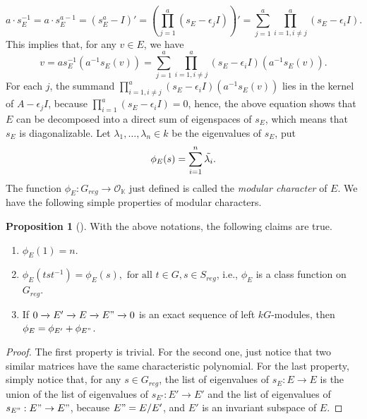\documentclass[12pt,a4paper]{report}
\theoremstyle{definition}
\newtheorem{proposition}[theorem]{Proposition}
\theoremstyle{remark}
\theoremstyle{definition}
\begin{document}
\begin{equation*}
    a\cdot s_E^{-1} = a\cdot s_E^{a-1} = (s_E^a - I)' = \left(\prod\limits_{j = 1}^{a}(s_E - \epsilon_j I) \right)' = \sum\limits_{j=1}^{a}\prod\limits_{i = 1, i\neq j}^{a}(s_E - \epsilon_i I).
\end{equation*}
This implies that, for any $v\in E$, we have
\begin{equation*}
    v = a s_E^{-1} (a^{-1} s_E(v)) = \sum\limits_{j=1}^{a}\prod\limits_{i = 1, i\neq j}^{a}(s_E - \epsilon_i I)(a^{-1}s_E(v)).
\end{equation*}
For each $j$, the summand $\prod\limits_{i = 1, i\neq j}^{a}(s_E - \epsilon_i I)(a^{-1}s_E(v))$ lies in the kernel of $A-\epsilon_j I$, because $\prod\limits_{i = 1}^{a}(s_E - \epsilon_i I) = 0$, hence, the above equation shows that $E$ can be decomposed into a direct sum of eigenspaces of $s_E$, which means that $s_E$ is diagonalizable.\smallbreak
Let $\lambda_1, \ldots, \lambda_n \in k$ be the eigenvalues of $s_E$, put
\begin{equation*}
    \phi_E(s) = \sum\limits_{i=1}^{n}\Tilde{\lambda_i}.
\end{equation*}
The function $\phi_E: G_{reg}\to \mathcal{O}_{\mathbb{K}}$ just defined is called the \emph{modular character} of $E$. We have the following simple properties of modular characters.
\begin{proposition}[{\cite[Subsection 18.1]{serre1977representations}}]\label{prop: properties of Brauer_char}
With the above notations, the following claims are true.
\begin{enumerate}
    \item $\phi_E(1) = n$.
    \item $\phi_E(tst^{-1}) = \phi_E(s), \text{ for all } t\in G, s\in S_{reg}$, i.e., $\phi_E$ is a class function on $G_{reg}$.
    \item If $0\xrightarrow{} E' \xrightarrow{} E \xrightarrow{} E" \xrightarrow{} 0$ is an exact sequence of left $kG$-modules, then $\phi_E = \phi_{E'}+\phi_{E"}$.
\end{enumerate}
\end{proposition}
\begin{proof}
    The first property is trivial. For the second one, just notice that two similar matrices have the same characteristic polynomial. For the last property, simply notice that, for any $s\in G_{reg}$, the list of eigenvalues of $s_E: E\to E$ is the union of the list of eigenvalues of $s_{E'}: E'\to E'$ and the list of eigenvalues of $s_{E"}: E"\to E"$, because $E" = E/E'$, and $E'$ is an invariant subspace of $E$.    
\end{proof}
\end{document}

